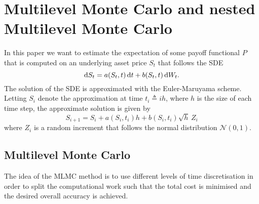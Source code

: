 \section{Multilevel Monte Carlo and nested Multilevel Monte Carlo} \label{sec:MLMC}

In this paper we want to estimate the expectation of some payoff functional $P$ that is computed on an underlying asset price $S_t$ that follows the SDE
\begin{equation}
{\rm d}S_t = a(S_t,t)\, {\rm d}t + b(S_t,t)\, {\rm d}W_t.
\end{equation}
The solution of the SDE is approximated with the Euler-Maruyama scheme. 
Letting $S_i$
denote the approximation at time $t_i\triangleq ih$, where $h$ is the size of each time step,
the approximate solution is given by 
\begin{equation}\label{eq:GBM_sde}
    S_{i+1} = S_{i} + a(S_i,t_i)h +  b(S_i,t_i) \sqrt{h}\, Z_i
\end{equation}
where $Z_i$ is a random increment that follows the normal distribution $\mathcal{N}(0,1)$.


\subsection{Multilevel Monte Carlo}

The idea of the MLMC method is to use different levels of time discretisation in order to split the computational work such that the total cost is minimised and the desired overall accuracy is achieved. 

